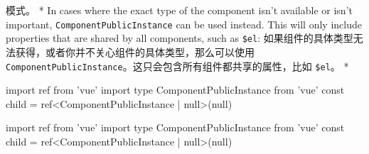 \begin{paracol}{2}
{模式}。
\switchcolumn[0]*%
In cases where the exact type of the component isn't available or isn't
important, \texttt{ComponentPublicInstance} can be used instead. This
will only include properties that are shared by all components, such as
\texttt{\$el}:
\switchcolumn
如果组件的具体类型无法获得，或者你并不关心组件的具体类型，那么可以使用
\texttt{ComponentPublicInstance}。这只会包含所有组件都共享的属性，比如
\texttt{\$el}。
\switchcolumn[0]*%
\begin{codeTs}
import { ref } from 'vue'
import type { ComponentPublicInstance } from 'vue'
const child = ref<ComponentPublicInstance | null>(null)
\end{codeTs}
\switchcolumn
\begin{codeTs}
import { ref } from 'vue'
import type { ComponentPublicInstance } from 'vue'
const child = ref<ComponentPublicInstance | null>(null)
\end{codeTs}
\end{paracol}

 